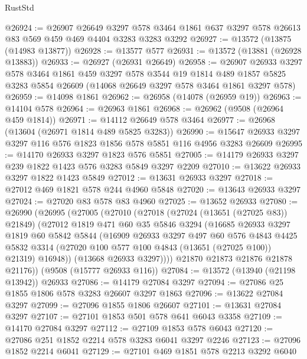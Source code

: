 \begin{lexlean}{RustStd}
\begin{coremodule}
@26924 := @26907
    @26649
    @3297
    @578
    @3464
    @1861
    @637
    @3297
    @578
    @26613
    @83
    @569
    @459
    @469
    @4404
    @3283
    @3283
    @3292
@26927 := @13572 (@13875 (@14983 @13877))
@26928 := @13577 @577
@26931 := @13572 (@13881 (@26928 @13883))
@26933 := @26927 (@26931 @26649)
@26958 := @26907
    @26933
    @3297
    @578
    @3464
    @1861
    @459
    @3297
    @578
    @3544
    @19
    @1814
    @489
    @1857
    @5825
    @3283
    @5854
    @26609
    (@14068 @26649 @3297 @578 @3464 @1861 @3297 @578)
@26959 := @14098 @1861
@26962 := @26958 (@14078 (@26959 @19))
@26963 := @14104 @578
@26964 := @26963 @1861
@26968 := @26962 (@9508 (@26964 @459 @1814))
@26971 := @14112 @26649 @578 @3464
@26977 := @26968 (@13604 (@26971 @1814 @489 @5825 @3283))
@26990 := @15647 @26933 @3297 @3297 @116 @576 @1823 @1856 @578 @5851 @116 @4956 @3283 @26609
@26995 := @14170 @26933 @3297 @1823 @576 @5851
@27005 := @14179 @26933 @3297 @239 @1822 @1423 @576 @3283 @5849 @3297 @2209
@27010 := @13622 @26933 @3297 @1822 @1423 @5849
@27012 := @13631 @26933 @3297
@27018 := @27012 @469 @1821 @578 @244 @4960 @5848
@27020 := @13643 @26933 @3297
@27024 := @27020 @83 @578 @83 @4960
@27025 := @13652 @26933
@27080 := @26990
    (@26995
      (@27005
        (@27010
          (@27018
            (@27024 (@13651 (@27025 @83)) @21849)
            (@27012
              @1819
              @471
              @60
              @35
              @5846
              @3294
              (@16685
                @26933
                @3297
                @1819
                @60
                @5842
                @5844
                (@16909
                  @26933
                  @3297
                  @497
                  @60
                  @576
                  @4843
                  @4425
                  @5832
                  @3314
                  (@27020 @100 @577 @100 @4843 (@13651 (@27025 @100)) @21319)
                  @16948))
              (@13668 @26933 @3297))))
        @21870
        @21873
        @21876
        @21878
        @21176))
    (@9508 (@15777 @26933 @116))
@27084 := @13572 (@13940 (@21198 @13942)) @26933
@27086 := @14179 @27084 @3297
@27094 := @27086 @25 @1855 @1806 @578 @3283 @26607 @3297 @1863
@27096 := @13622 @27084 @3297
@27099 := @27096 @1855 @1806 @26607
@27101 := @13631 @27084 @3297
@27107 := @27101 @1853 @501 @578 @641 @6043 @3358
@27109 := @14170 @27084 @3297
@27112 := @27109 @1853 @578 @6043
@27120 := @27086 @251 @1852 @2214 @578 @3283 @6041 @3297 @2246
@27123 := @27096 @1852 @2214 @6041
@27129 := @27101 @469 @1851 @578 @2213 @3292 @6040

\end{coremodule}
\end{lexlean}

